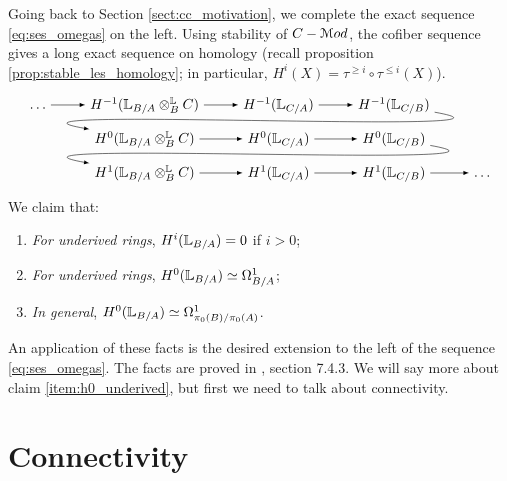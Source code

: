 \documentclass[10pt,a4paper,reqno,oneside]{book} %
\theoremstyle{plain}
\theoremstyle{definition}
\theoremstyle{remark}
\numberwithin{equation}{section}
\begin{document}
Going back to Section \ref{sect:cc_motivation}, we complete the exact sequence \ref{eq:ses_omegas} on the left. 
Using stability of $C-\mathcal M od$, the cofiber sequence gives a long exact sequence on homology (recall proposition
\ref{prop:stable_les_homology}; in particular, $H^i(X) = \tau^{\geq i} \circ \tau^{\leq i}(X)$).
\[
\begin{tikzpicture}[descr/.style={fill=white,inner sep=1.5pt}]
\label{tikz:les}
        \matrix (m) [
            matrix of math nodes,
            row sep=1em,
            column sep=2.5em,
            text height=1.5ex, text depth=0.25ex
        ]
        { \dots & H^{-1}(\bbL_{B/A} \otimes^{\bbL}_{B} C) & H^{-1}(\bbL_{C/A}) & H^{-1}(\bbL_{C/B}) & \\
            & H^0(\bbL_{B/A} \otimes^{\bbL}_{B} C) & H^0(\bbL_{C/A}) & H^0(\bbL_{C/B}) & \\
            & H^1(\bbL_{B/A} \otimes^{\bbL}_{B} C) & H^1(\bbL_{C/A}) & H^1(\bbL_{C/B}) & \dots \\
        };

        \path[overlay,->, font=\scriptsize,>=latex]
        (m-1-1) edge (m-1-2)
        (m-1-2) edge (m-1-3)
        (m-1-3) edge (m-1-4)
        (m-1-4) edge[out=350,in=170]  (m-2-2)
        (m-2-2) edge (m-2-3)
        (m-2-3) edge (m-2-4)
        (m-2-4) edge[out=350,in=170]  (m-3-2)
        (m-3-2) edge (m-3-3)
        (m-3-3) edge (m-3-4)
				(m-3-4) edge (m-3-5);
\end{tikzpicture}
\]
We claim that:
\begin{enumerate}
\item \label{item:h0_underived}
\textit{For underived rings}, $H^i(\mathbb L_{B/A}) = 0$ if $i>0$;
\item \textit{For underived rings}, $H^0(\mathbb L_{B/A}) \simeq \Omega^1_{B/A}$;
\item \textit{In general}, $H^0(\mathbb L_{B/A}) \simeq \Omega^1_{\pi_0(B)/\pi_0(A)}$.
\end{enumerate}
An application of these facts is the desired extension
to the left of the sequence \ref{eq:ses_omegas}. The facts are proved in \cite{Lurie_Higher_algebra}, section 7.4.3. 
We will say more about claim \ref{item:h0_underived}, but first we need to talk about connectivity. 



\section{Connectivity}
\label{sect:cc_connectivity}
\end{document}
